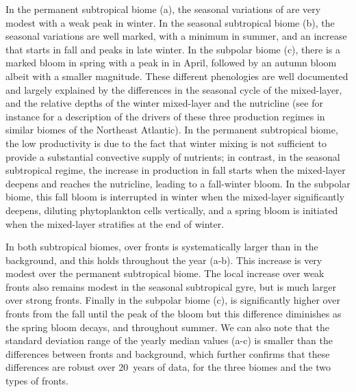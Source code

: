 In the permanent subtropical biome (a), the seasonal variations of  are very modest with a weak peak in winter.
In the seasonal subtropical biome (b), the seasonal variations are well marked, with a minimum in summer, and an increase that starts in fall and peaks in late winter.
In the subpolar biome (c), there is a marked bloom in spring with a peak in  in April, followed by an autumn bloom albeit with a smaller magnitude.
These different phenologies are well documented and largely explained by the differences in the seasonal cycle of the mixed-layer, and the relative depths of the winter mixed-layer and the nutricline (see for instance \textcite{levy_2005a} for a description of the drivers of these three production regimes in similar biomes of the Northeast Atlantic).
In the permanent subtropical biome, the low productivity is due to the fact that winter mixing is not sufficient to provide a substantial convective supply of nutrients; in contrast, in the seasonal subtropical regime, the increase in production in fall starts when the mixed-layer deepens and reaches the nutricline, leading to a fall-winter bloom.
In the subpolar biome, this fall bloom is interrupted in winter when the mixed-layer significantly deepens, diluting phytoplankton cells vertically, and a spring bloom is initiated when the mixed-layer stratifies at the end of winter.

In both subtropical biomes,  over fronts is systematically larger than in the background, and this holds throughout the year (a-b).
This increase is very modest over the permanent subtropical biome.
The local increase over weak fronts also remains modest in the seasonal subtropical gyre, but is much larger over strong fronts.
Finally in the subpolar biome (c),  is significantly higher over fronts from the fall until the peak of the bloom but this difference diminishes as the spring bloom decays, and throughout summer.
We can also note that the standard deviation range of the yearly median values (a-c) is smaller than the differences between fronts and background, which further confirms that these differences are robust over 20~years of data, for the three biomes and the two types of fronts.

